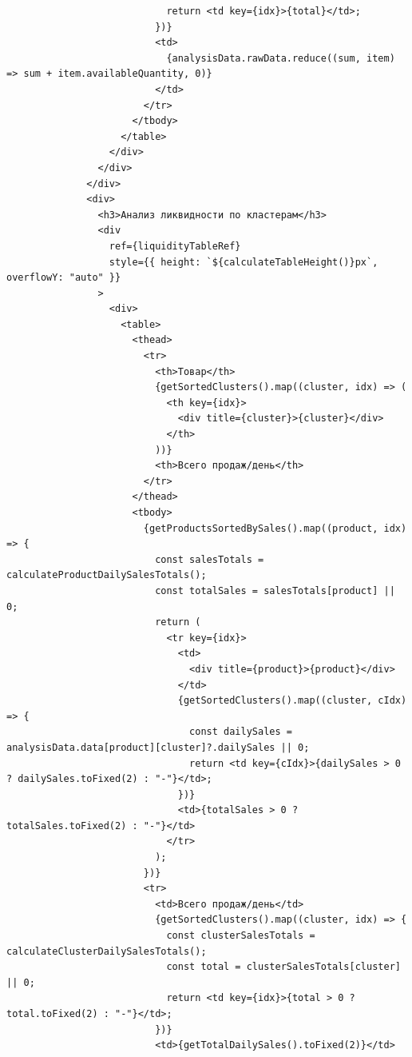 \begin{code}
\begin{verbatim}
                            return <td key={idx}>{total}</td>;
                          })}
                          <td>
                            {analysisData.rawData.reduce((sum, item) => sum + item.availableQuantity, 0)}
                          </td>
                        </tr>
                      </tbody>
                    </table>
                  </div>
                </div>
              </div>
              <div>
                <h3>Анализ ликвидности по кластерам</h3>
                <div
                  ref={liquidityTableRef}
                  style={{ height: `${calculateTableHeight()}px`, overflowY: "auto" }}
                >
                  <div>
                    <table>
                      <thead>
                        <tr>
                          <th>Товар</th>
                          {getSortedClusters().map((cluster, idx) => (
                            <th key={idx}>
                              <div title={cluster}>{cluster}</div>
                            </th>
                          ))}
                          <th>Всего продаж/день</th>
                        </tr>
                      </thead>
                      <tbody>
                        {getProductsSortedBySales().map((product, idx) => {
                          const salesTotals = calculateProductDailySalesTotals();
                          const totalSales = salesTotals[product] || 0;
                          return (
                            <tr key={idx}>
                              <td>
                                <div title={product}>{product}</div>
                              </td>
                              {getSortedClusters().map((cluster, cIdx) => {
                                const dailySales = analysisData.data[product][cluster]?.dailySales || 0;
                                return <td key={cIdx}>{dailySales > 0 ? dailySales.toFixed(2) : "-"}</td>;
                              })}
                              <td>{totalSales > 0 ? totalSales.toFixed(2) : "-"}</td>
                            </tr>
                          );
                        })}
                        <tr>
                          <td>Всего продаж/день</td>
                          {getSortedClusters().map((cluster, idx) => {
                            const clusterSalesTotals = calculateClusterDailySalesTotals();
                            const total = clusterSalesTotals[cluster] || 0;
                            return <td key={idx}>{total > 0 ? total.toFixed(2) : "-"}</td>;
                          })}
                          <td>{getTotalDailySales().toFixed(2)}</td>

\end{verbatim}
\end{code}
